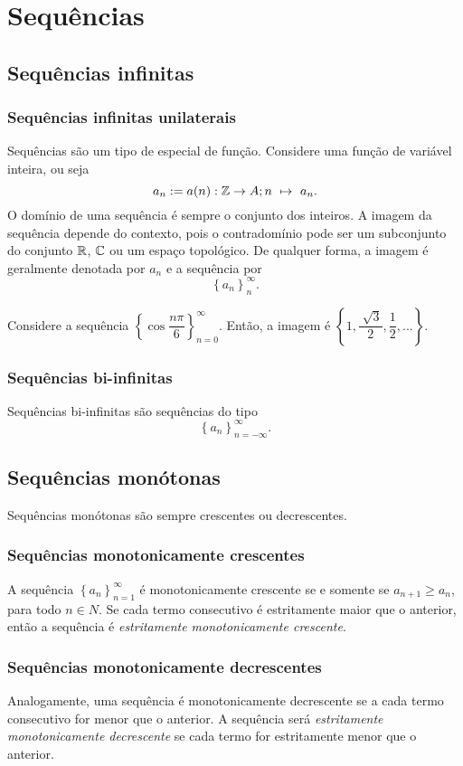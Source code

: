 \section{Sequências}
   \subsection{Sequências infinitas}
      \subsubsection{Sequências infinitas unilaterais}
         Sequências são um tipo de especial de função. Considere uma função de variável inteira, ou seja $$a_{n} := a(n): \mathbb{Z} \to A; n\ \mapsto\ a_{n}.$$
         O domínio de uma sequência é sempre o conjunto dos inteiros. A imagem da sequência depende do contexto, pois o contradomínio pode ser um subconjunto do conjunto $\mathbb{R}$, $\mathbb{C}$ ou um espaço topológico. 
         De qualquer forma, a imagem é geralmente denotada por $a_{n}$ e a sequência por
         $$\left\{a_{n}\right\}^{\infty}_{n}.$$ 
         \begin{exmp}
            Considere a sequência $\left\{\cos{\dfrac{n\pi}{6}}\right\}^{\infty}_{n=0}$. Então, a imagem é $\left\{1,\dfrac{\sqrt[]{3}}{2}, \dfrac{1}{2}, ...\right\}.$
         \end{exmp}
      
      \subsubsection{Sequências bi-infinitas}
         Sequências bi-infinitas são sequências do tipo $$\left\{a_{n}\right\}^{\infty}_{n=-\infty}.$$ 
   
   \subsection{Sequências monótonas}
      Sequências monótonas são sempre crescentes ou decrescentes. 
         \subsubsection{Sequências monotonicamente crescentes}
               A sequência $\left\{a_{n}\right\}^{\infty}_{n=1}$ é monotonicamente crescente se e somente se $a_{n+1} \geq a_{n}$, para todo $n \in N$. 
               Se cada termo consecutivo é estritamente maior que o anterior, então a sequência é \emph{estritamente monotonicamente crescente}.
            \subsubsection{Sequências monotonicamente decrescentes}
               Analogamente, uma sequência é monotonicamente decrescente se a cada termo consecutivo for menor que o anterior. A sequência será \emph{estritamente monotonicamente decrescente} se cada termo for estritamente menor que o anterior.
      
